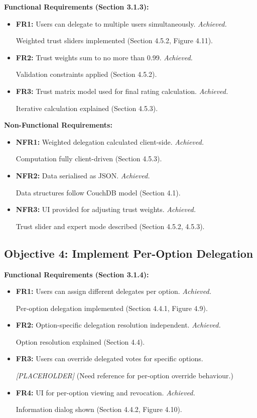\textbf{Functional Requirements (Section 3.1.3):}
\begin{itemize}
    \item \textbf{FR1:} Users can delegate to multiple users simultaneously. \textit{Achieved.} 
    
    Weighted trust sliders implemented (Section 4.5.2, Figure 4.11).
    \item \textbf{FR2:} Trust weights sum to no more than 0.99. \textit{Achieved.} 
    
    Validation constraints applied (Section 4.5.2).
    \item \textbf{FR3:} Trust matrix model used for final rating calculation. \textit{Achieved.} 
    
    Iterative calculation explained (Section 4.5.3).
\end{itemize}

\textbf{Non-Functional Requirements:}
\begin{itemize}
    \item \textbf{NFR1:} Weighted delegation calculated client-side. \textit{Achieved.} 
    
    Computation fully client-driven (Section 4.5.3).
    \item \textbf{NFR2:} Data serialised as JSON. \textit{Achieved.} 
    
    Data structures follow CouchDB model (Section 4.1).
    \item \textbf{NFR3:} UI provided for adjusting trust weights. \textit{Achieved.} 
    
    Trust slider and expert mode described (Section 4.5.2, 4.5.3).
\end{itemize}

\subsection{Objective 4: Implement Per-Option Delegation}

\textbf{Functional Requirements (Section 3.1.4):}
\begin{itemize}
    \item \textbf{FR1:} Users can assign different delegates per option. \textit{Achieved.} 
    
    Per-option delegation implemented (Section 4.4.1, Figure 4.9).
    \item \textbf{FR2:} Option-specific delegation resolution independent. \textit{Achieved.} 
    
    Option resolution explained (Section 4.4).
    \item \textbf{FR3:} Users can override delegated votes for specific options. 
    
    \textit{[PLACEHOLDER]} (Need reference for per-option override behaviour.)
    \item \textbf{FR4:} UI for per-option viewing and revocation. \textit{Achieved.}
    
    Information dialog shown (Section 4.4.2, Figure 4.10).
\end{itemize}

